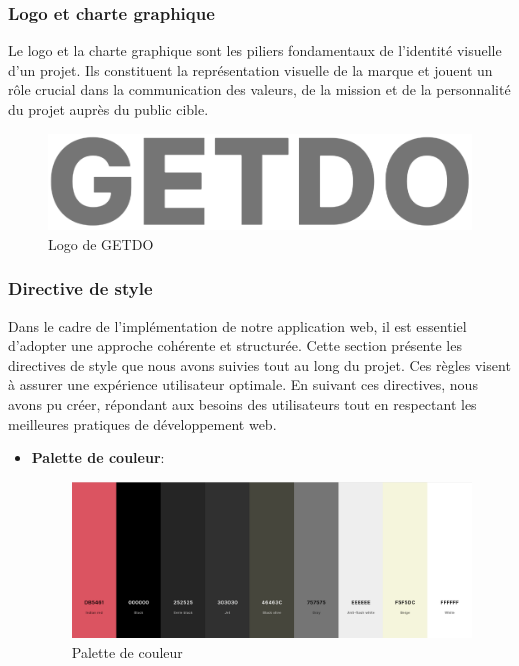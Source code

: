 \documentclass[a4paper,12pt]{report}
\begin{document}
\subsubsection{Logo et charte graphique}
Le logo et la charte graphique sont les piliers fondamentaux de l'identité visuelle d'un projet. Ils constituent la représentation visuelle de la marque et jouent un rôle crucial dans la communication des valeurs, de la mission et de la personnalité du projet auprès du public cible.

\begin{figure}[h!]
    \includegraphics[width=1\textwidth]{./images/GETDO_logo.png}
    \caption{Logo de GETDO}
    \label{fig:jira_project_task}
\end{figure}

\subsubsection{Directive de style}
Dans le cadre de l'implémentation de notre application web, il est essentiel d'adopter une approche cohérente et structurée. Cette section présente les directives de style que nous avons suivies tout au long du projet. Ces règles visent à assurer une expérience utilisateur optimale. En suivant ces directives, nous avons pu créer, répondant aux besoins des utilisateurs tout en respectant les meilleures pratiques de développement web.
\begin{itemize}
  \item\textbf{Palette de couleur}:
  \begin{figure}[h!]
    \includegraphics[width=1\textwidth]{./images/getdo-color-palette.png}
    \caption{Palette de couleur}
    \label{fig:jira_project_task}
  \end{figure}

\end{itemize}
\end{document}
